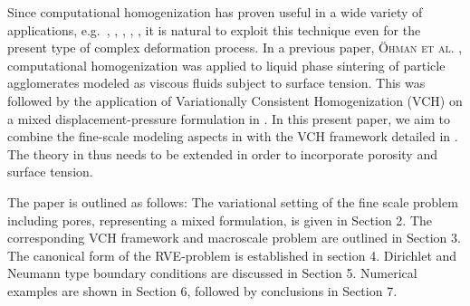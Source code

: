 \documentclass[12pt,a4paper]{article}
\begin{document}
Since computational homogenization has proven useful in a wide variety of applications, e.g.\ \cite{klinge_application_2012}, \cite{miehe_computational_2002}, \cite{oskay_eigendeformation-based_2007}, \cite{sandstrom_variationally_2012}, \cite{zohdi_model_2001}, it is natural to exploit this technique even for the present type of complex deformation process.
%
In a previous paper, \textsc{\"Ohman et al.} \cite{ohman_computational_2013}, computational homogenization was applied to liquid phase sintering of particle agglomerates modeled as viscous fluids subject to surface tension.
This was followed by the application of Variationally Consistent Homogenization (VCH) on a mixed displacement-pressure formulation in \cite{ohman_variationally_2014}.
In this present paper, we aim to combine the fine-scale modeling aspects in \cite{ohman_computational_2013} with the VCH framework detailed in \cite{ohman_variationally_2014}.
The theory in \cite{ohman_variationally_2014} thus needs to be extended in order to incorporate porosity and surface tension.




% 

The paper is outlined as follows:
The variational setting of the fine scale problem including pores, representing a mixed formulation, is given in Section 2.
The corresponding VCH framework and macroscale problem are outlined in Section 3.
The canonical form of the RVE-problem is established in section 4.
Dirichlet and Neumann type boundary conditions are discussed in Section 5.
Numerical examples are shown in Section 6, followed by conclusions in Section 7.
\end{document}
